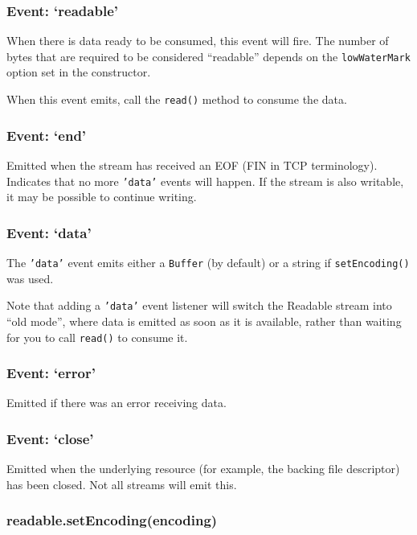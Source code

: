 \subsubsection{Event: `readable'}

When there is data ready to be consumed, this event will fire. The
number of bytes that are required to be considered ``readable'' depends
on the \texttt{lowWaterMark} option set in the constructor.

When this event emits, call the \texttt{read()} method to consume the
data.

\subsubsection{Event: `end'}

Emitted when the stream has received an EOF (FIN in TCP terminology).
Indicates that no more \texttt{'data'} events will happen. If the stream
is also writable, it may be possible to continue writing.

\subsubsection{Event: `data'}

The \texttt{'data'} event emits either a \texttt{Buffer} (by default) or
a string if \texttt{setEncoding()} was used.

Note that adding a \texttt{'data'} event listener will switch the
Readable stream into ``old mode'', where data is emitted as soon as it
is available, rather than waiting for you to call \texttt{read()} to
consume it.

\subsubsection{Event: `error'}

Emitted if there was an error receiving data.

\subsubsection{Event: `close'}

Emitted when the underlying resource (for example, the backing file
descriptor) has been closed. Not all streams will emit this.

\subsubsection{readable.setEncoding(encoding)}

